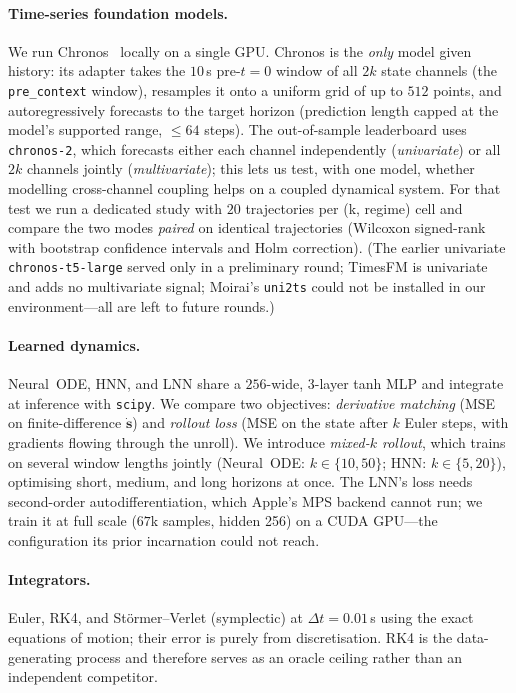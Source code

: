 \documentclass{article}
\begin{document}
\paragraph{Time-series foundation models.} We run Chronos~\citep{ansari2024chronos}
locally on a single GPU. Chronos is the \emph{only} model given history: its adapter
takes the $10$\,s pre-$t{=}0$ window of all $2k$ state channels (the
\texttt{pre\_context} window), resamples it onto a uniform grid of up to $512$ points,
and autoregressively forecasts to the target horizon (prediction length capped at the
model's supported range, $\le 64$ steps). The out-of-sample
leaderboard uses \texttt{chronos-2}, which forecasts either each channel
independently (\emph{univariate}) or all $2k$ channels jointly (\emph{multivariate});
this lets us test, with one model, whether modelling cross-channel coupling helps on a
coupled dynamical system. For that test we run a dedicated study with $20$
trajectories per (k, regime) cell and compare the two modes \emph{paired} on
identical trajectories (Wilcoxon signed-rank with bootstrap confidence intervals and
Holm correction). (The earlier univariate \texttt{chronos-t5-large} served only in a
preliminary round; TimesFM is univariate and adds no multivariate signal; Moirai's
\texttt{uni2ts} could not be installed in our environment---all are left to future
rounds.)

\paragraph{Learned dynamics.} Neural~ODE, HNN, and LNN share a $256$-wide,
$3$-layer tanh MLP and integrate at inference with \texttt{scipy}. We compare two
objectives: \emph{derivative matching} (MSE on finite-difference $\dot{\mathbf{s}}$)
and \emph{rollout loss} (MSE on the state after $k$ Euler steps, with gradients
flowing through the unroll). We introduce \emph{mixed-$k$ rollout}, which trains on
several window lengths jointly (Neural~ODE: $k\in\{10,50\}$; HNN: $k\in\{5,20\}$),
optimising short, medium, and long horizons at once. The LNN's loss needs
second-order autodifferentiation, which Apple's MPS backend cannot run; we train it
at full scale ($67$k samples, hidden 256) on a CUDA GPU---the configuration its
prior incarnation could not reach.

\paragraph{Integrators.} Euler, RK4, and St\"ormer--Verlet (symplectic) at
$\Delta t{=}0.01$\,s using the exact equations of motion; their error is purely from
discretisation. RK4 is the data-generating process and therefore serves as an oracle
ceiling rather than an independent competitor.
\end{document}

